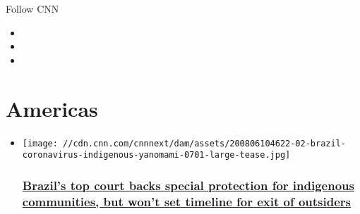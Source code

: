 Follow CNN

\begin{itemize}
\item
\item
\item
\end{itemize}

\hypertarget{americas}{%
\section{Americas}\label{americas}}

\begin{itemize}
\item
  \href{/2020/08/08/americas/brazil-supreme-court-indigenous-ruling-intl/index.html}{}

  \texttt{[image: //cdn.cnn.com/cnnnext/dam/assets/200806104622-02-brazil-coronavirus-indigenous-yanomami-0701-large-tease.jpg]}

  \hypertarget{brazils-top-court-backs-special-protection-for-indigenous-communities-but-wont-set-timeline-for-exit-of-outsiders}{%
  \subsubsection{\texorpdfstring{\href{/2020/08/08/americas/brazil-supreme-court-indigenous-ruling-intl/index.html}{Brazil's
  top court backs special protection for indigenous communities, but
  won't set timeline for exit of
  outsiders}}{Brazil's top court backs special protection for indigenous communities, but won't set timeline for exit of outsiders}}\label{brazils-top-court-backs-special-protection-for-indigenous-communities-but-wont-set-timeline-for-exit-of-outsiders}}
\end{itemize}

